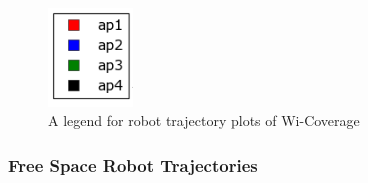 \begin{figure}[!h]
    \centering
    \includegraphics[width=0.2\textwidth]{images/legend.png}
    \caption{A legend for robot trajectory plots of Wi-Coverage}
    \label{fig:freespace}
\end{figure}

\subsubsection{Free Space Robot Trajectories}

